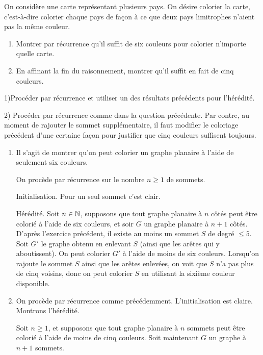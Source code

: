 \begin{exo} 
On considère une carte représentant plusieurs pays. On désire colorier la carte, c'est-à-dire colorier chaque pays de façon à ce que deux pays limitrophes n'aient pas la même couleur.
\begin{enumerate}
\item Montrer par récurrence qu'il suffit de six couleurs pour colorier n'importe quelle carte.
\item En affinant la fin du raisonnement, montrer qu'il suffit en fait de cinq couleurs.
\end{enumerate}

\begin{hint}
1)Procéder par récurrence et utiliser un des résultats précédents pour l'hérédité.

2) Procéder par récurrence comme dans la question précédente. Par contre, au moment de rajouter le sommet supplémentaire, il faut modifier le coloriage précédent d'une certaine façon pour justifier que cinq couleurs suffisent toujours.
\end{hint}
\begin{sol}
\begin{enumerate}
\item Il s'agit de montrer qu'on peut colorier un graphe planaire à l'aide de seulement six couleurs.

On procède par récurrence sur le nombre $n\geq 1$ de sommets. 

Initialisation. Pour un seul sommet c'est clair.

Hérédité. Soit $n\in \mathbb N$, supposons que tout graphe planaire à $n$ côtés peut être colorié à l'aide de six couleurs, et soir $G$ un graphe planaire à $n+1$ côtés. D'après l'exercice précédent, il existe au moins un sommet $S$ de degré $\leq 5$. Soit $G'$ le graphe obtenu en enlevant $S$ (ainsi que les arêtes qui y aboutissent). On peut colorier $G'$ à l'aide de moins de six couleurs. Lorsqu'on rajoute le sommet $S$ ainsi que les arêtes enlevées, on voit que $S$ n'a pas plus de cinq voisins, donc on peut colorier $S$ en utilisant la sixième couleur disponible.

\item On procède par récurrence comme précédemment. L'initialisation est claire. Montrons l'hérédité.

Soit $n\geq 1$, et supposons que tout graphe planaire à $n$ sommets peut être colorié à l'aide de moins de cinq couleurs. Soit maintenant $G$ un graphe à $n+1$ sommets.


\end{enumerate}
\end{sol}
\end{exo}
